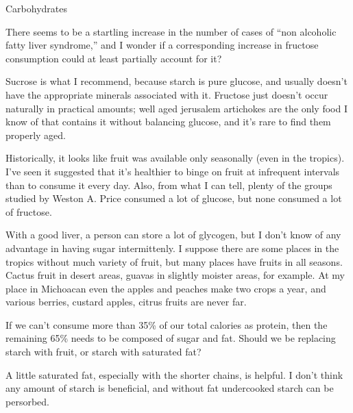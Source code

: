 \documentclass[11pt,oneside,openany,extrafontsizes]{memoir}
\begin{document}
\begin{emailexchange}{Carbohydrates}

    \begin{question}
        There seems to be a startling increase in the number of cases of \enquote{non alcoholic fatty liver syndrome,} and I wonder if a corresponding increase in fructose consumption could at least partially account for it?
    \end{question}

    \begin{answer}
      Sucrose is what I recommend, because starch is pure glucose, and usually doesn't have the appropriate minerals associated with it. Fructose just doesn't occur naturally in practical amounts; well aged jerusalem artichokes are the only food I know of that contains it without balancing glucose, and it's rare to find them properly aged.
    \end{answer}
	
    \begin{question}
        Historically, it looks like fruit was available only seasonally (even in the tropics). I've seen it suggested that it's healthier to binge on fruit at infrequent intervals than to consume it every day. Also, from what I can tell, plenty of the groups studied by Weston A. Price consumed a lot of glucose, but none consumed a lot of fructose.
    \end{question}

    \begin{answer}
      With a good liver, a person can store a lot of glycogen, but I don't know of any advantage in having sugar intermittenly. I suppose there are some places in the tropics without much variety of fruit, but many places have fruits in all seasons. Cactus fruit in desert areas, guavas in slightly moister areas, for example. At my place in Michoacan even the apples and peaches make two crops a year, and various berries, custard apples, citrus fruits are never far.
    \end{answer}
	
    \begin{question}
        If we can't consume more than 35\% of our total calories as protein, then the remaining 65\% needs to be composed of sugar and fat. Should we be replacing starch with fruit, or starch with saturated fat?
    \end{question}

    \begin{answer}
      A little saturated fat, especially with the shorter chains, is helpful. I don't think any amount of starch is beneficial, and without fat undercooked starch can be persorbed.
    \end{answer}
	

\end{emailexchange}
\end{document}

